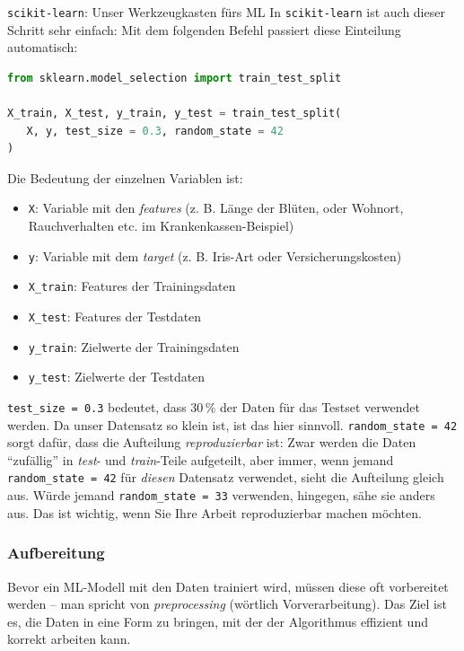 \begin{lpu}{\texttt{scikit-learn}: Unser Werkzeugkasten fürs ML}
In \texttt{scikit-learn} ist auch dieser Schritt sehr einfach: Mit dem folgenden Befehl passiert diese Einteilung automatisch:




\begin{lstlisting}[language=Python]
from sklearn.model_selection import train_test_split

X_train, X_test, y_train, y_test = train_test_split(
   X, y, test_size = 0.3, random_state = 42
)
\end{lstlisting}


Die Bedeutung der einzelnen Variablen ist:

\begin{itemize}
  \item \texttt{X}: Variable mit den \textit{features} (z. B. Länge der Blüten, oder Wohnort, Rauchverhalten etc. im Krankenkassen-Beispiel)
  \item \texttt{y}: Variable mit dem \textit{target} (z. B. Iris-Art oder Versicherungskosten)

  \item \texttt{X\_train}: Features der Trainingsdaten
  \item \texttt{X\_test}: Features der Testdaten
  \item \texttt{y\_train}: Zielwerte der Trainingsdaten
  \item \texttt{y\_test}: Zielwerte der Testdaten
\end{itemize}

\texttt{test\_size = 0.3} bedeutet, dass 30\,\% der Daten für das Testset verwendet werden. Da unser Datensatz so klein ist, ist das hier sinnvoll.
\texttt{random\_state = 42} sorgt dafür, dass die Aufteilung \textit{reproduzierbar} ist: Zwar werden die Daten ``zufällig'' in \textit{test}- und \textit{train}-Teile aufgeteilt, aber immer, wenn jemand \texttt{random\_state = 42} für \textit{diesen} Datensatz verwendet, sieht die Aufteilung gleich aus. Würde jemand \texttt{random\_state = 33} verwenden, hingegen, sähe sie anders aus. Das ist wichtig, wenn Sie Ihre Arbeit reproduzierbar machen möchten.

\subsubsection*{Aufbereitung}

Bevor ein ML-Modell mit den Daten trainiert wird, müssen diese oft vorbereitet werden – man spricht von \textit{preprocessing} (wörtlich Vorverarbeitung). Das Ziel ist es, die Daten in eine Form zu bringen, mit der der Algorithmus effizient und korrekt arbeiten kann.


\end{lpu}
